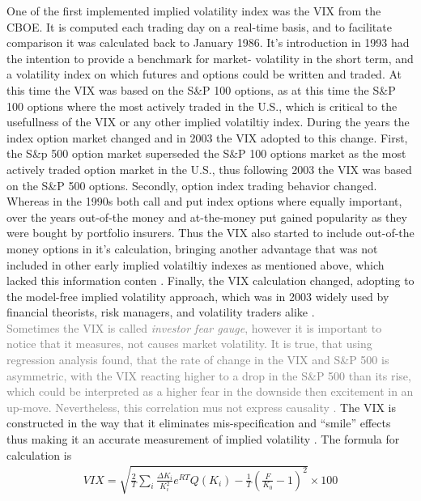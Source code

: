 One of the first implemented implied volatility index was the VIX from the \gls{CBOE}. It is computed each trading day on a real-time basis, and to facilitate comparison it was calculated back to January 1986. It's introduction in 1993 had the intention to provide a benchmark for market- volatility in the short term, and a volatility index on which futures and options could be written and traded. At this time the VIX was based on the S\&P 100 options, as at this time the S\&P 100 options where the most actively traded in the U.S., which is critical to the usefullness of the VIX or any other implied volatiltiy index. During the years the index option market changed and in 2003 the VIX adopted to this change. First, the S\&p 500 option market superseded the S\&P 100 options market as the most actively traded option market in the U.S., thus following 2003 the VIX was based on the S\&P 500 options. Secondly, option index trading behavior changed. Whereas in the 1990s both call and put index options where equally important, over the years out-of-the money and at-the-money put gained popularity as they were bought by portfolio insurers. Thus the VIX also started to include out-of-the money options in it's calculation, bringing another advantage that was not included in other early implied volatiltiy indexes as mentioned above, which lacked this information conten \parencite{whaley2008}. Finally, the VIX calculation changed, adopting to the model-free implied volatility approach, which was in 2003 widely used by financial theorists, risk managers, and volatility traders alike \parencite{Cboe2009}.\\
\textcolor{gray} {Sometimes the VIX is called \emph{investor fear gauge}, however it is important to notice that it measures, not causes market volatility. It is true, that using regression analysis \textcite{whaley2008} found, that the rate of change in the VIX and S\&P 500 is asymmetric, with the VIX reacting higher to a drop in the S\&P 500 than its rise, which could be interpreted as a higher fear in the downside then excitement in an up-move. Nevertheless, this correlation mus not express causality \parencite{whaley2008}.} The VIX is constructed in the way that it eliminates mis-specification and ``smile'' effects thus making it an accurate measurement of implied volatility \parencite{blair2001}. The formula for calculation is
\begin{align}\label{eq: VIX}
VIX = \sqrt{\frac{2}{T} \sum_{i} \frac{\Delta K_{i}}{K_{i}^{2}} e^{RT} Q(K_{i}) - \frac{1}{T} (\frac{F}{K_{0}} - 1)^{2}} \times 100
\end{align}
